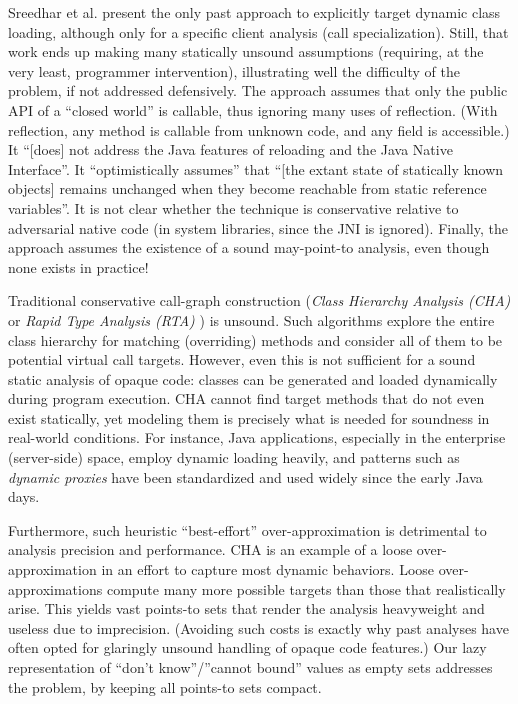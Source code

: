 Sreedhar et al. \cite{pldi:2000:Sreedhar} present the
only past approach to explicitly target dynamic class loading,
although only for a specific client analysis (call
specialization). Still, that work ends up making many statically
unsound assumptions (requiring, at the very least, programmer
intervention), illustrating well the difficulty of the problem, if not
addressed defensively. The approach assumes that only the public API
of a ``closed world'' is callable, thus ignoring many uses of
reflection. (With reflection, any method is callable from unknown
code, and any field is accessible.) It ``[does] not address the Java
features of reloading and the Java Native Interface''. It
``optimistically assumes'' that ``[the extant state of statically
  known objects] remains unchanged when they become reachable from
static reference variables''. It is not clear whether the technique is
conservative relative to adversarial native code (in system libraries,
since the JNI is ignored). Finally, the approach assumes the existence
of a sound may-point-to analysis, even though none exists in practice!

Traditional conservative call-graph construction (\emph{Class
  Hierarchy Analysis (CHA)} \cite{ecoop:1995:Dean} or
\emph{Rapid Type Analysis (RTA)} \cite{oopsla:1996:Bacon}) is
unsound.  Such algorithms explore the entire class hierarchy for
matching (overriding) methods and consider all of them to be potential
virtual call targets. However, even this is not sufficient for a sound static
analysis of opaque code: classes can be generated and loaded
dynamically during program execution. CHA cannot find target methods
that do not even exist statically, yet modeling them is precisely what
is needed for soundness in real-world conditions. For instance, Java
applications, especially in the enterprise (server-side) space, employ
dynamic loading heavily, and patterns such as \emph{dynamic proxies}
have been standardized and used widely since the early Java days.

Furthermore, such heuristic ``best-effort'' over-approximation is
detrimental to analysis precision and performance. CHA is an example
of a loose over-approximation in an effort to capture most dynamic
behaviors.
Loose over-approximations compute many more possible targets than
those that realistically arise. This yields vast points-to sets that
render the analysis heavyweight and useless due to imprecision.
(Avoiding such costs is exactly why past analyses have often opted for glaringly
unsound handling of opaque code features.)
Our lazy representation of ``don't know''/''cannot bound'' values as empty
sets addresses the problem, by keeping all points-to sets compact.


